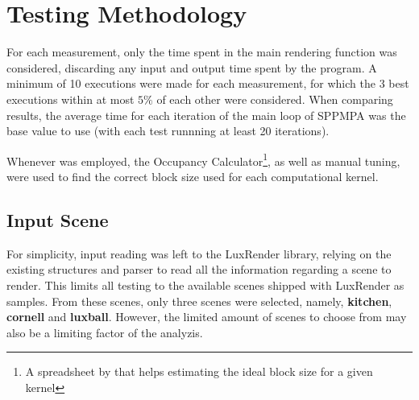 \documentclass[main.tex]{subfiles}
\begin{document}
\section{Testing Methodology} \label{sec:results:method}

For each measurement, only the time spent in the main rendering function was considered, discarding any input and output time spent by the program. A minimum of 10 executions were made for each measurement, for which the 3 best executions within at most $5\%$ of each other were considered. When comparing results, the average time for each iteration of the main loop of SPPMPA was the base value to use (with each test runnning at least 20 iterations).

Whenever \cuda was employed, the \cuda Occupancy Calculator\footnote{A spreadsheet by \nvidia that helps estimating the ideal block size for a given kernel}, as well as manual tuning, were used to find the correct block size used for each computational kernel.

\subsection{Input Scene}

For simplicity, input reading was left to the LuxRender library, relying on the existing structures and parser to read all the information regarding a scene to render. This limits all testing to the available scenes shipped with LuxRender as samples. From these scenes, only three scenes were selected, namely, \textbf{kitchen}, \textbf{cornell} and \textbf{luxball}. However, the limited amount of scenes to choose from may also be a limiting factor of the analyzis.
\end{document}
